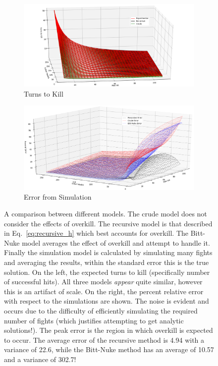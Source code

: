 \documentclass[../../main.tex]{subfiles}
\begin{document}
				\begin{figure}
					\centering
					\begin{subfigure}{.5\textwidth}
						\centering
						\includegraphics[width=\linewidth]{img/h2k_h2.png}
						\caption{Turns to Kill}
					\end{subfigure}%
					\begin{subfigure}{.5\textwidth}
						\centering
						\includegraphics[width=\linewidth]{img/error.png}
						\caption{Error from Simulation}
					\end{subfigure}
					\caption{
						A comparison between different models. The crude model does not consider the effects of overkill. The recursive model is that described in Eq.~\ref{eq:recursive_h} which best accounts for overkill. The Bitt-Nuke model averages the effect of overkill and attempt to handle it. Finally the simulation model is calculated by simulating many fights and averaging the results, within the standard error this is the true solution. On the left, the expected turns to kill (specifically number of successful hits). All three models \textit{appear} quite similar, however this is an artifact of scale. On the right, the percent relative error with respect to the simulations are shown. The noise is evident and occurs due to the difficulty of efficiently simulating the required number of fights (which justifies attempting to get analytic solutions!). The peak error is the region in which overkill is expected to occur. The average error of the recursive method is 4.94 with a variance of 22.6, while the Bitt-Nuke method has an average of 10.57 and a variance of 302.7!
					}\label{fig:comparison}
				\end{figure}
\end{document}
